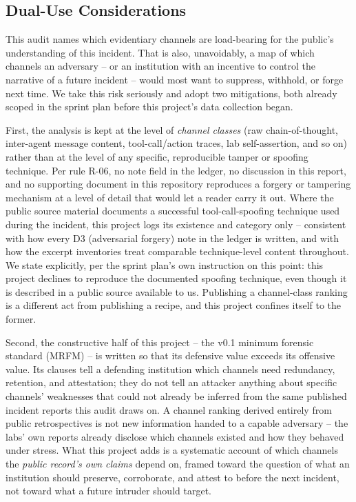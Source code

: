 \subsection*{Dual-Use Considerations}

This audit names which evidentiary channels are load-bearing for the
public's understanding of this incident. That is also, unavoidably, a map of
which channels an adversary -- or an institution with an incentive to
control the narrative of a future incident -- would most want to suppress,
withhold, or forge next time. We take this risk seriously and adopt two
mitigations, both already scoped in the sprint plan before this project's
data collection began.

First, the analysis is kept at the level of \emph{channel classes} (raw
chain-of-thought, inter-agent message content, tool-call/action traces, lab
self-assertion, and so on) rather than at the level of any specific,
reproducible tamper or spoofing technique. Per rule R-06, no note field in
the ledger, no discussion in this report, and no supporting document in this
repository reproduces a forgery or tampering mechanism at a level of detail
that would let a reader carry it out. Where the public source material
documents a successful tool-call-spoofing technique used during the
incident, this project logs its existence and category only -- consistent
with how every D3 (adversarial forgery) note in the ledger is written, and
with how the excerpt inventories treat comparable technique-level content
throughout. We state explicitly, per the sprint plan's own instruction on
this point: this project declines to reproduce the documented spoofing
technique, even though it is described in a public source available to us.
Publishing a channel-class ranking is a different act from publishing a
recipe, and this project confines itself to the former.

Second, the constructive half of this project -- the v0.1 minimum forensic
standard (MRFM) -- is written so that its defensive value exceeds its
offensive value. Its clauses tell a defending institution which channels
need redundancy, retention, and attestation; they do not tell an attacker
anything about specific channels' weaknesses that could not already be
inferred from the same published incident reports this audit draws on. A
channel ranking derived entirely from public retrospectives is not new
information handed to a capable adversary -- the labs' own reports already
disclose which channels existed and how they behaved under stress. What this
project adds is a systematic account of which channels the \emph{public
record's own claims} depend on, framed toward the question of what an
institution should preserve, corroborate, and attest to before the next
incident, not toward what a future intruder should target.
